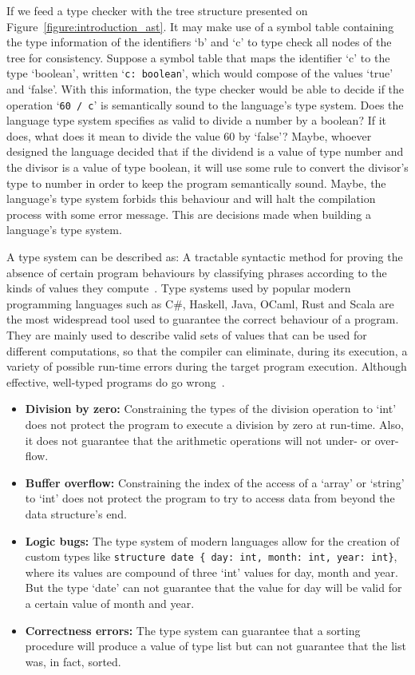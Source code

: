\documentclass[
  english,
  lmodern,
  oneside
]{ufsc-thesis-rn46-2019/ufsc-thesis-rn46-2019}
\begin{document}
If we feed a type checker with the tree structure presented on Figure~\ref{figure:introduction_ast}.
It may make use of a symbol table containing the type information of the identifiers `b' and `c' to type check all nodes of the tree for consistency.
Suppose a symbol table that maps the identifier `c' to the type `boolean', written `\verb+c: boolean+', which would compose of the values `true' and `false'.
With this information, the type checker would be able to decide if the operation `\verb+60 / c+' is semantically sound to the language's type system.
Does the language type system specifies as valid to divide a number by a boolean?
If it does, what does it mean to divide the value 60 by `false'?
Maybe, whoever designed the language decided that if the dividend is a value of type number and the divisor is a value of type boolean, it will use some rule to convert the divisor's type to number in order to keep the program semantically sound.
Maybe, the language's type system forbids this behaviour and will halt the compilation process with some error message.
This are decisions made when building a language's type system.

A type system can be described as: A tractable syntactic method for proving the absence of certain program behaviours by classifying phrases according to the kinds of values they compute~\cite{pierce2002types}.
Type systems used by popular modern programming languages such as C\#, Haskell, Java, OCaml, Rust and Scala are the most widespread tool used to guarantee the correct behaviour of a program.
They are mainly used to describe valid sets of values that can be used for different computations, so that the compiler can eliminate, during its execution, a variety of possible run-time errors during the target program execution.
Although effective, well-typed programs do go wrong~\cite{jhala2020refinement}.

\begin{itemize}
  \item \textbf{Division by zero:} Constraining the types of the division operation to `int' does not protect the program to execute a division by zero at run-time.
Also, it does not guarantee that the arithmetic operations will not under- or over-flow.
  \item \textbf{Buffer overflow:} Constraining the index of the access of a `array' or `string' to `int' does not protect the program to try to access data from beyond the data structure's end.
  \item \textbf{Logic bugs:} The type system of modern languages allow for the creation of custom types like \verb+structure date { day: int, month: int, year: int}+, where its values are compound of three `int' values for day, month and year.
But the type `date' can not guarantee that the value for day will be valid for a certain value of month and year.
  \item \textbf{Correctness errors:} The type system can guarantee that a sorting procedure will produce a value of type list  but can not guarantee that the list was, in fact, sorted.
\end{itemize}
\end{document}
